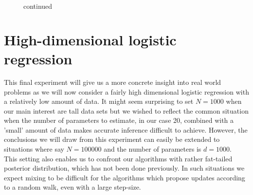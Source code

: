 \documentclass[11pt,a4paper]{report}\usepackage[]{graphicx}\usepackage[]{color}
\begin{document}
\begin{figure}[H]
\ContinuedFloat
\caption{continued}
\centering
{}
\end{figure}


\section{High-dimensional logistic regression}
This final experiment will give us a more concrete insight into real world problems as we will now consider a fairly high dimensional logistic regression with a relatively low amount of data. It might seem surprising to set $N=1000$ when our main interest are tall data sets but we wished to reflect the common situation when the number of parameters to estimate, in our case 20, combined with a 'small' amount of data makes accurate inference difficult to achieve. However, the conclusions we will draw from this experiment can easily be extended to situations where say $N=100000$ and the number of parameters is $d=1000$.\\
This setting also enables us to confront our algorithms with rather fat-tailed posterior distribution, which has not been done previously. In such situations we expect mixing to be difficult for the algorithms which propose updates according to a random walk, even with a large step-size. 
\end{document}
